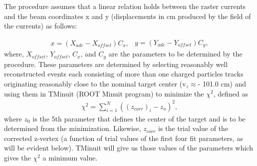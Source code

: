 The procedure assumes that a linear relation holds between the raster currents and the beam coordinates x and y (displacements %
in cm produced by the field of the currents) as follows:

\begin{subequations}
\label{eqRC-Adc2cm}
\begin{eqnarray}
\label{eqRC-Adc2cm1}
x = (X_{adc}-X_{offset})C_x,
\end{eqnarray}

\begin{eqnarray}
\label{eqRC-Adc2cm2}
y = (Y_{adc}-Y_{offset})C_y,
\end{eqnarray}
\end{subequations}
where, $X_{offset}$, $Y_{offset}$, $C_x$, and $C_y$ are the %
parameters to be determined by the procedure. These parameters are determined by selecting reasonably well reconstructed events each consisting of more than one charged  particles tracks originating reasonably close to the nominal target center (v$_z \approx $- 101.0 cm) and using them in TMinuit (ROOT Minuit program) to minimize the $\chi^2$, defined as
\begin{eqnarray}
\label{eqRC-chiSq}
\chi^2 = \sum^N_{i=1}((z_{corr})_i - z_o)^2,
\end{eqnarray}
where $z_0$ is the 5th parameter that defines the center of the target and is to be determined from the minimization. %
Likewise, $z_{corr}$ is the trial value of the corrected z-vertex (a function of trial values of the first four fit parameters, as will be evident below). TMinuit will give us those values of the parameters which gives 
the $\chi^2$ a minimum value.


